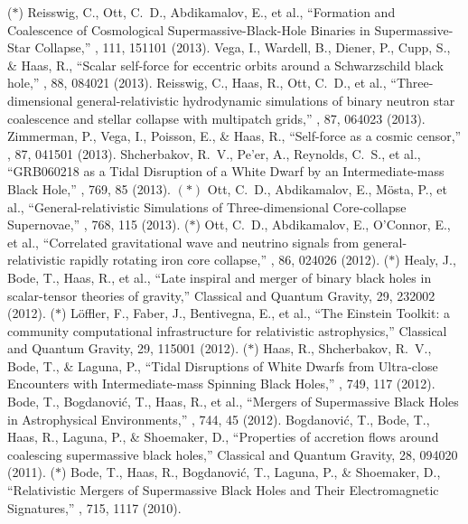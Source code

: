  ($*$) Reisswig, C., Ott, C.~D., Abdikamalov, E., et al., ``Formation and Coalescence of Cosmological Supermassive-Black-Hole Binaries in Supermassive-Star Collapse,'' \prl, 111, 151101 (2013).
 Vega, I., Wardell, B., Diener, P., Cupp, S., \& Haas, R., ``Scalar self-force for eccentric orbits around a Schwarzschild black hole,'' \prd, 88, 084021 (2013).
 Reisswig, C., Haas, R., Ott, C.~D., et al., ``Three-dimensional general-relativistic hydrodynamic simulations of binary neutron star coalescence and stellar collapse with multipatch grids,'' \prd, 87, 064023 (2013).
 Zimmerman, P., Vega, I., Poisson, E., \& Haas, R., ``Self-force as a cosmic censor,'' \prd, 87, 041501 (2013).
 Shcherbakov, R.~V., Pe'er, A., Reynolds, C.~S., et al., ``GRB060218 as a Tidal Disruption of a White Dwarf by an Intermediate-mass Black Hole,'' \apj, 769, 85 (2013).
 $(*)$ Ott, C.~D., Abdikamalov, E., M{\"o}sta, P., et al., ``General-relativistic Simulations of Three-dimensional Core-collapse Supernovae,'' \apj, 768, 115 (2013).
 ($*$) Ott, C.~D., Abdikamalov, E., O'Connor, E., et al., ``Correlated gravitational wave and neutrino signals from general-relativistic rapidly rotating iron core collapse,'' \prd, 86, 024026 (2012).
 ($*$) Healy, J., Bode, T., Haas, R., et al., ``Late inspiral and merger of binary black holes in scalar-tensor theories of gravity,'' Classical and Quantum Gravity, 29, 232002 (2012).
 ($*$) L{\"o}ffler, F., Faber, J., Bentivegna, E., et al., ``The Einstein Toolkit: a community computational infrastructure for relativistic astrophysics,'' Classical and Quantum Gravity, 29, 115001 (2012).
 ($*$) Haas, R., Shcherbakov, R.~V., Bode, T., \& Laguna, P., ``Tidal Disruptions of White Dwarfs from Ultra-close Encounters with Intermediate-mass Spinning Black Holes,'' \apj, 749, 117 (2012).
 Bode, T., Bogdanovi{\'c}, T., Haas, R., et al., ``Mergers of Supermassive Black Holes in Astrophysical Environments,'' \apj, 744, 45 (2012).
 Bogdanovi{\'c}, T., Bode, T., Haas, R., Laguna, P., \& Shoemaker, D., ``Properties of accretion flows around coalescing supermassive black holes,'' Classical and Quantum Gravity, 28, 094020 (2011).
 ($*$) Bode, T., Haas, R., Bogdanovi{\'c}, T., Laguna, P., \& Shoemaker, D., ``Relativistic Mergers of Supermassive Black Holes and Their Electromagnetic Signatures,'' \apj, 715, 1117 (2010).
